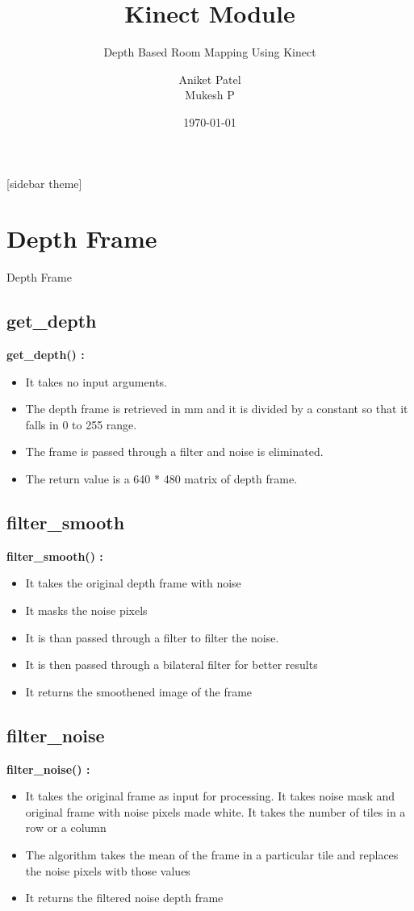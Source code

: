 \documentclass[10pt, a4paper]{beamer}
\begin{document}
	\title{Kinect Module}
	\subtitle{Depth Based Room Mapping Using Kinect}
	\author{Aniket Patel\\ Mukesh P}
	\date{\today}
	\frame{\titlepage}

[sidebar theme]
\section{Depth Frame}
\begin{frame}[allowframebreaks]{Depth Frame}
  \subsection{get\_depth}
    \textbf{get\_depth() : }
    \begin{itemize}
     \item It takes no input arguments.
     \item The depth frame is retrieved in mm and it is divided by a constant so that it falls in 0 to 255 range.
     \item The frame is passed through a filter and noise is eliminated.
     \item The return value is a 640 * 480 matrix of depth frame.
    \end{itemize}
  \framebreak
  \subsection{filter\_smooth}
    \textbf{filter\_smooth() : }
    \begin{itemize}
     \item It takes the original depth frame with noise
     \item It masks the noise pixels
     \item It is than passed through a filter to filter the noise. 
     \item It is then passed through a bilateral filter for better results
     \item It returns the smoothened image of the frame
    \end{itemize}
  \framebreak
  \subsection{filter\_noise}
    \textbf{filter\_noise() : }
     \begin{itemize}
      \item It takes the original frame as input for processing. It takes noise mask and original frame with noise pixels made white. It takes the number of tiles in a row or a column
      \item The algorithm takes the mean of the frame in a particular tile and replaces the noise pixels witb those values
      \item It returns the filtered noise depth frame
     \end{itemize}
\end{frame}
\end{document}
